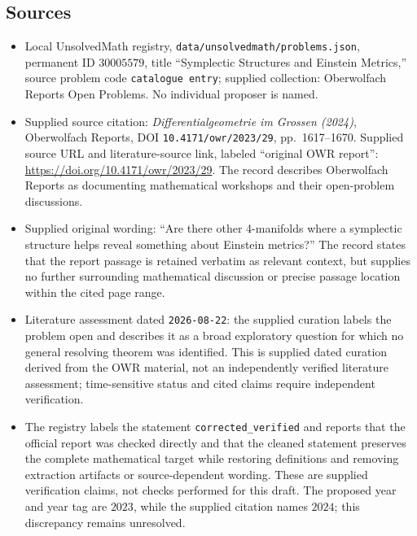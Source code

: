 \documentclass[11pt]{article}
\begin{document}
\subsection{Sources}
\begin{itemize}
\item Local UnsolvedMath registry, \texttt{data/unsolvedmath/problems.json}, permanent ID \(30005579\), title ``Symplectic Structures and Einstein Metrics,'' source problem code \texttt{catalogue entry}; supplied collection: Oberwolfach Reports Open Problems. No individual proposer is named.
\item Supplied source citation: \emph{Differentialgeometrie im Grossen (2024)}, Oberwolfach Reports, DOI \texttt{10.4171/owr/2023/29}, pp.\ 1617--1670. Supplied source URL and literature-source link, labeled ``original OWR report'': \url{https://doi.org/10.4171/owr/2023/29}. The record describes Oberwolfach Reports as documenting mathematical workshops and their open-problem discussions.
\item Supplied original wording: ``Are there other 4-manifolds where a symplectic structure helps reveal something about Einstein metrics?'' The record states that the report passage is retained verbatim as relevant context, but supplies no further surrounding mathematical discussion or precise passage location within the cited page range.
\item Literature assessment dated \texttt{2026-08-22}: the supplied curation labels the problem open and describes it as a broad exploratory question for which no general resolving theorem was identified. This is supplied dated curation derived from the OWR material, not an independently verified literature assessment; time-sensitive status and cited claims require independent verification.
\item The registry labels the statement \texttt{corrected\_verified} and reports that the official report was checked directly and that the cleaned statement preserves the complete mathematical target while restoring definitions and removing extraction artifacts or source-dependent wording. These are supplied verification claims, not checks performed for this draft. The proposed year and year tag are \(2023\), while the supplied citation names \(2024\); this discrepancy remains unresolved.
\end{itemize}
\end{document}
